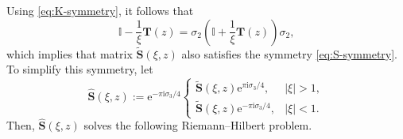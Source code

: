 \documentclass[11pt]{article}
\numberwithin{equation}{section}
\numberwithin{equation}{section}
\newcommand{\ee}{\mathrm{e}}
\newcommand{\ii}{\mathrm{i}}
\begin{document}
Using \eqref{eq:K-symmetry}, it follows that
\[
\mathbb I - \dfrac{1}{\xi}\mathbf T(z) = \sigma_2\left( \mathbb I + \dfrac{1}{\xi}\mathbf T(z) \right) \sigma_2,
\]
which implies that matrix $\widetilde{\mathbf{S}}(\xi, z)$ also satisfies the symmetry \eqref{eq:S-symmetry}. To simplify this symmetry, let
\begin{equation}
\widehat{\mathbf{S}}(\xi, z) := \ee^{-\pi \ii \sigma_3/4 } \begin{cases} \widetilde{\mathbf{S}}(\xi, z) \ee^{\pi \ii \sigma_3/4}, & |\xi| >1, \\
\widetilde{\mathbf{S}}(\xi, z) \ee^{-\pi \ii \sigma_3/4}, & |\xi| <1.
\end{cases}
 \label{eq:rotation-transformation}
\end{equation}
Then, $\widehat{\mathbf{S}}(\xi, z)$ solves the following Riemann--Hilbert problem.
\end{document}
